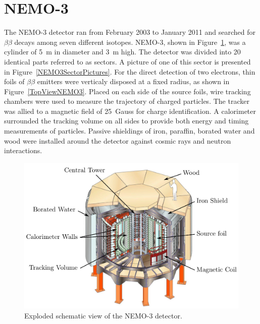 \documentclass[main.tex]{subfiles}
\begin{document}
\FloatBarrier


\section{NEMO-3}\label{sec:NEMO3}


\NI The NEMO-3 detector ran from February 2003 to January 2011 and searched for $\beta\beta$ decays among seven different isotopes. NEMO-3, shown in Figure~\ref{NEMO3Detector}, was a cylinder of 5~m in diameter and 3~m high. The detector was divided into 20 identical parts referred to as sectors. A picture of one of this sector is presented in Figure~\ref{NEMO3SectorPictures}. For the direct detection of two electrons, thin foils of $\beta\beta$ emitters were verticaly disposed at a fixed radius, as shown in Figure~\ref{TopViewNEMO3}. Placed on each side of the source foils, wire tracking chambers were used to measure the trajectory of charged particles. The tracker was allied to a magnetic field of 25~Gauss for charge identification. A calorimeter surrounded the tracking volume on all sides to provide both energy and timing measurements of particles. Passive shieldings of iron, paraffin, borated water and wood were installed around the detector against cosmic rays and neutron interactions.


\begin{figure}[h!]
\begin{center}
\includegraphics[scale=0.35]{pictures/Chap2/NEMO-3-Schema.png}
\caption{Exploded schematic view of the NEMO-3 detector.}
\label{NEMO3Detector}
\end{center}
\end{figure}
\end{document}
